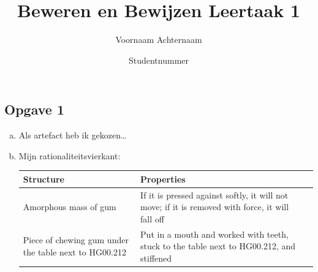 \documentclass{article}
\title{Beweren en Bewijzen Leertaak 1}
\author{Voornaam Achternaam \and Studentnummer}
\newcommand{\ratvierkant}[5]{%
\begin{center}
\begin{tabular}{|m{#5}|m{#5}|m{0.4cm}|}
\hline
{\normalfont\upshape Structure} & {\normalfont\upshape Properties} & \\
\hline
{#1} & {#2} & {\normalfont\upshape \rotatebox{-90}{Description~}}\\
\hline
{#3} & {#4} & {\normalfont\upshape \rotatebox{-90}{Physical reality~}}\\
\hline
\end{tabular}
\end{center}
}
\begin{document}
\maketitle %


\subsection*{Opgave 1}
\begin{enumerate}[a)]
 \item %
  Als artefact heb ik gekozen\dots  
 \item %
  Mijn rationaliteitsvierkant:
 
 
  \ratvierkant%
  {Amorphous mass of gum}%
  {If it is pressed against softly, it will not move; if it is removed with force, it will fall off}%
  {Piece of chewing gum under the table next to HG00.212}%
  {Put in a mouth and worked with teeth, stuck to the table next to HG00.212, and stiffened}%
  {6cm}

\end{enumerate}
\end{document}
